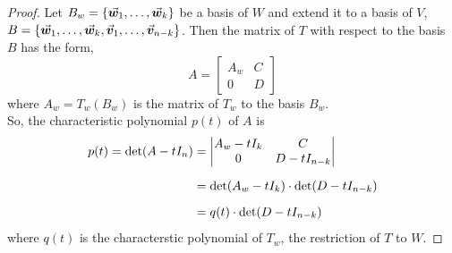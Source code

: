 \documentclass[../MathsNotesBase.tex]{subfiles}
\begin{document}
{		\bigskip
		\begin{proof}
			Let ${ B_w = \{ \vec{\bm{w}}_1, \dots, \vec{\bm{w}}_k \} }$ be a basis of $W$ and extend it to a basis of $V$, ${ B = \{ \vec{\bm{w}}_1, \dots, \vec{\bm{w}}_k, \vec{\bm{v}}_1, \dots, \vec{\bm{v}}_{n-k} \} }$. Then the matrix of $T$ with respect to the basis $B$ has the form,
			\[ A = 	\begin{bmatrix}
						A_w & C  \\
						0   & D
					\end{bmatrix}
			\]
			where ${ A_w = T_w(B_w) }$ is the matrix of $T_w$ \wrt to the basis $B_w$.\\
			So, the characteristic polynomial $p(t)$ of $A$ is
			\[\begin{aligned}
				p(t) = \det (A - tI_n) &=
									\begin{vmatrix}
										A_w - tI_k & C \\
										0               & D - tI_{n-k}
									\end{vmatrix} \nn
				&= \det (A_w - tI_k) \cdot \det (D - tI_{n-k}) \nn
				&= q(t) \cdot \det (D - tI_{n-k})
			\end{aligned}\]
			where $q(t)$ is the characterstic polynomial of $T_w$, the restriction of $T$ to $W$. 		
		\end{proof}
	
}
\end{document}
